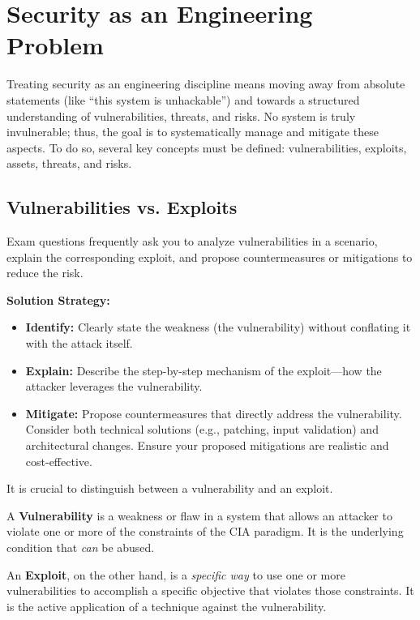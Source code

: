 \section{Security as an Engineering Problem}
Treating security as an engineering discipline means moving away from absolute statements (like ``this system is unhackable'') and towards a structured understanding of vulnerabilities, threats, and risks. No system is truly invulnerable; thus, the goal is to systematically manage and mitigate these aspects. To do so, several key concepts must be defined: vulnerabilities, exploits, assets, threats, and risks.

\subsection{Vulnerabilities vs. Exploits}

\begin{tcolorbox}[colback=blue!5!white,colframe=blue!75!black,title=Exam Insight]
Exam questions frequently ask you to analyze vulnerabilities in a scenario, explain the corresponding exploit, and propose countermeasures or mitigations to reduce the risk.

\textbf{Solution Strategy:}
\begin{itemize}
    \item \textbf{Identify:} Clearly state the weakness (the vulnerability) without conflating it with the attack itself.
    \item \textbf{Explain:} Describe the step-by-step mechanism of the exploit—how the attacker leverages the vulnerability.
    \item \textbf{Mitigate:} Propose countermeasures that directly address the vulnerability. Consider both technical solutions (e.g., patching, input validation) and architectural changes. Ensure your proposed mitigations are realistic and cost-effective.
\end{itemize}
\end{tcolorbox}
It is crucial to distinguish between a vulnerability and an exploit. 

A \textbf{Vulnerability} is a weakness or flaw in a system that allows an attacker to violate one or more of the constraints of the CIA paradigm. It is the underlying condition that \textit{can} be abused.

An \textbf{Exploit}, on the other hand, is a \textit{specific way} to use one or more vulnerabilities to accomplish a specific objective that violates those constraints. It is the active application of a technique against the vulnerability.

